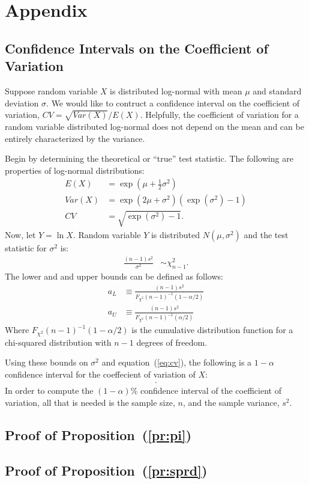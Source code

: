 \documentclass[titlepage]{article}
\begin{document}
\newpage

\appendix
\section{Appendix}
\subsection{Confidence Intervals on the Coefficient of Variation}
\label{app:cov}

Suppose random variable $X$ is distributed log-normal with mean $\mu$ and standard deviation $\sigma$. We would like to contruct a confidence interval on the coefficient of variation, $CV=\sqrt{Var(X)}/E(X)$. Helpfully, the coefficient of variation for a random variable distributed log-normal does not depend on the mean and can be entirely characterized by the variance.

Begin by determining the theoretical or ``true'' test statistic. The following are properties of log-normal distributions:
\begin{align}
E(X) & =  \exp(\mu+\frac{1}{2} \sigma^{2}) \\
Var(X) & =  \exp(2\mu + \sigma^{2})(\exp(\sigma^{2})-1) \\
\label{eq:cv} CV & = \sqrt{\exp(\sigma^{2})-1}.
\end{align}
Now, let $Y=\ln X$. Random variable $Y$ is distributed $N(\mu,\sigma^{2})$ and the test statistic for $\sigma^{2}$ is:
\begin{align*}
\frac{(n-1)s^{2}}{\sigma^{2}} & \sim \chi^{2}_{n-1}.
\end{align*}
The lower and and upper bounds can be defined as follows:
\begin{align*}
a_{L}&\equiv\frac{(n-1)s^{2}}{F_{\chi^{2}}(n-1)^{-1}(1-\alpha/2)}\\
a_{U}&\equiv\frac{(n-1)s^{2}}{F_{\chi^{2}}(n-1)^{-1}(\alpha/2)}
\end{align*}
Where $F_{\chi^{2}}(n-1)^{-1}(1-\alpha/2)$ is the cumulative distribution function for a chi-squared distribution with $n-1$ degrees of freedom. 

Using these bounds on $\sigma^{2}$ and equation~(\ref{eq:cv}), the following is a $1-\alpha$ confidence interval for the coeffecient of variation of $X$:
\begin{align}
[ \sqrt{\exp(a_{L})-1},\sqrt{\exp(a_{U})-1} ].
\end{align}
In order to compute the $(1-\alpha)$\% confidence interval of the coefficient of variation, all that is needed is the sample size, $n$, and the sample variance, $s^{2}$.

\subsection{Proof of Proposition~(\ref{pr:pi})}
\label{app:pr:pi}

\subsection{Proof of Proposition~(\ref{pr:sprd})}
\end{document}
